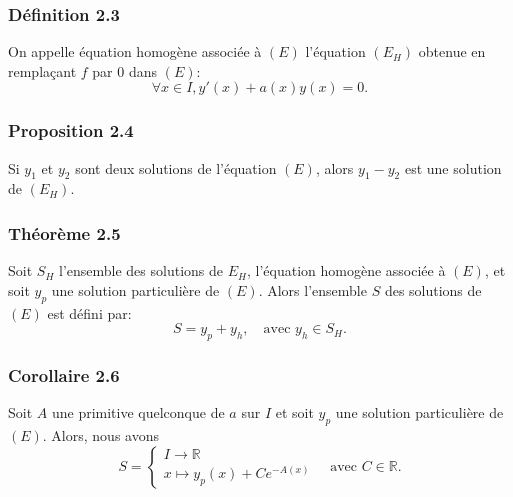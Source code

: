\documentclass{beamer}
\begin{document}
\begin{frame}
    \frametitle{Définition 2.3}
    \begin{defi}
    On appelle équation homogène associée à $(E)$ l'équation $(E_{H})$ obtenue en remplaçant $f$ par $0$ dans $(E)$:
    \begin{equation*}
    \forall x \in I, y'(x) + a(x)y(x) = 0.
    \end{equation*}
    \end{defi}
\end{frame}

\begin{frame}
    \frametitle{Proposition 2.4}
    \begin{prop}
    Si $y_{1}$ et $y_{2}$ sont deux solutions de l'équation $(E)$, alors $y_{1} - y_{2}$ est une solution de $(E_{H})$.
    \end{prop}
\end{frame}

\begin{frame}
    \frametitle{Théorème 2.5}
    \begin{theo}
    Soit $S_{H}$ l'ensemble des solutions de $E_{H}$, l'équation homogène associée à $(E)$, et soit $y_{p}$ une solution particulière de $(E)$. Alors l'ensemble $S$ des solutions de $(E)$ est défini par: 
    \[
    S = y_{p} + y_{h}, \quad \text{avec } y_{h} \in S_{H}.
    \]
    \end{theo}
\end{frame}

\begin{frame}
    \frametitle{Corollaire 2.6}
    \begin{coro}
    Soit $A$ une primitive quelconque de $a$ sur $I$ et soit $y_{p}$ une solution particulière de $(E)$. Alors, nous avons 
    \[
    S = \begin{cases}
    I \longrightarrow \mathbb{R} \\
    x \longmapsto y_{p}(x) + Ce^{-A(x)}
    \end{cases}
    \quad \text{avec } C \in \mathbb{R}.
    \]
    \end{coro}
\end{frame}
\end{document}
